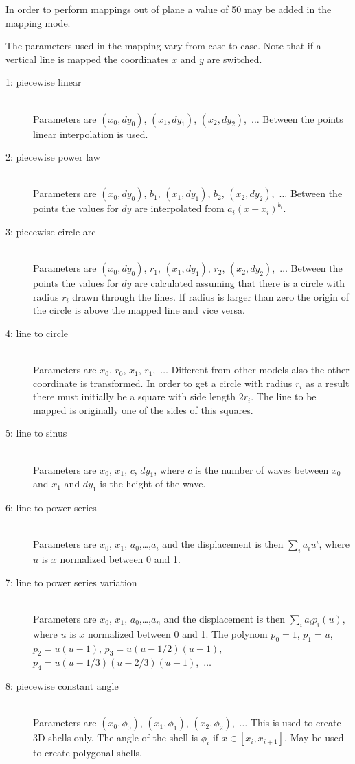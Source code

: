 In order to perform mappings out of plane a value
of 50 may be added in the mapping mode.

The parameters used in the mapping vary from case to case.
Note that if a vertical line is mapped the coordinates $x$ and $y$
are switched.
\begin{description}
\item[1: piecewise linear] \mbox{} \\
Parameters are $(x_0,dy_0)$, $(x_1,dy_1)$, $(x_2,dy_2)$,~$\ldots$
Between the points linear interpolation is used. 
\item[2: piecewise power law] \mbox{} \\
Parameters are
$(x_0,dy_0)$, $b_1$, $(x_1,dy_1)$, $b_2$, $(x_2,dy_2)$,~$\ldots$
Between the points the values for $dy$ are interpolated from
$a_i (x-x_i)^{b_i}$.
\item[3: piecewise circle arc] \mbox{} \\
Parameters are
$(x_0,dy_0)$, $r_1$, $(x_1,dy_1)$, $r_2$, $(x_2,dy_2)$,~$\ldots$
Between the points the values for $dy$ are calculated assuming that
there is a circle with radius $r_i$ drawn through the lines.
If radius is larger than zero the origin of the circle is 
above the mapped line and vice versa.
\item[4: line to circle] \mbox{} \\
Parameters are $x_0$, $r_0$, $x_1$, $r_1$,~$\ldots$
Different from other models also the other coordinate is 
transformed. In order to get a circle with radius $r_i$ 
as a result there must initially be a square with 
side length $2r_i$. The line to be mapped is originally 
one of the sides of this squares.
\item[5: line to sinus] \mbox{} \\
Parameters are $x_0$, $x_1$, $c$, $dy_1$,
where $c$ is the number of waves between $x_0$ and $x_1$
and $dy_1$ is the height of the wave.
\item[6: line to power series] \mbox{} \\	
Parameters are $x_0$, $x_1$, $a_0$,\ldots,$a_i$
and the displacement is then $\sum_i a_i u^i$,
where $u$ is $x$ normalized between 0 and 1. 
\item[7: line to power series variation] \mbox{} \\	
Parameters are $x_0$, $x_1$, $a_0$,\ldots,$a_n$
and the displacement is then $\sum_i a_i p_i(u)$,
where $u$ is $x$ normalized between 0 and 1.
The polynom $p_0=1$, $p_1=u$, $p_2=u(u-1)$, 
$p_3=u(u-1/2)(u-1)$, $p_4=u(u-1/3)(u-2/3)(u-1)$,~$\ldots$
\item[8: piecewise constant angle] \mbox{} \\
Parameters are $(x_0,\phi_0)$, $(x_1,\phi_1)$, $(x_2,\phi_2)$,~$\ldots$
This is used to create 3D shells only. 
The angle of the shell is $\phi_i$ if $x \in [x_i,x_{i+1}]$. 
May be used to create polygonal shells.

\end{description}

